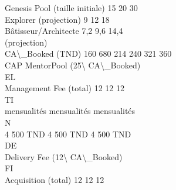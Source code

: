 Genesis Pool (taille initiale)         15               20            30\\
Explorer (projection)                   9               12            18\\
Bâtisseur/Architecte                  7,2              9,6           14,4\\
(projection)\\
CA\textbackslash{}_Booked (TND)                     160 680          214 240       321 360\\
CAP MentorPool (25\textbackslash{}%
CA\textbackslash{}_Booked)\\
\vspace{0.5em}
\vspace{0.5em}
\vspace{0.5em}
\vspace{0.5em}
EL\\
Management Fee (total)                12                12            12\\
\vspace{0.5em}
\vspace{0.5em}
\vspace{0.5em}
\vspace{0.5em}
TI\\
mensualités       mensualités   mensualités\\
\vspace{0.5em}
\vspace{0.5em}
\vspace{0.5em}
\vspace{0.5em}
N\\
4 500 TND         4 500 TND     4 500 TND\\
\vspace{0.5em}
\vspace{0.5em}
\vspace{0.5em}
\vspace{0.5em}
DE\\
Delivery Fee (12\textbackslash{}%
CA\textbackslash{}_Booked)\\
\vspace{0.5em}
\vspace{0.5em}
\vspace{0.5em}
\vspace{0.5em}
FI\\
Acquisition (total)                   12                12            12\\
